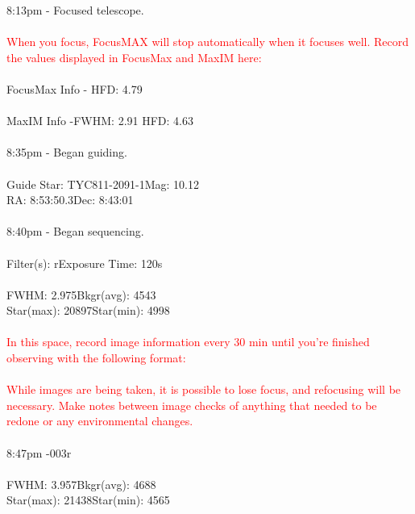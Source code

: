 \documentclass[11pt]{report}
\begin{document}
8:13pm - Focused telescope. \\ \\
\textcolor{red}{When you focus, FocusMAX will stop automatically when it focuses well. Record the values displayed in FocusMax and MaxIM here:} \\  \\
FocusMax Info - \hspace{72pt}HFD: 4.79 \\ \\
MaxIM Info -\hspace{90pt}FWHM: 2.91 \hspace{75pt}HFD: 4.63 \\ \\
8:35pm - Began guiding. \\ \\
Guide Star: TYC811-2091-1\hspace{20pt}Mag: 10.12 \\
RA: 8:53:50.3\hspace{90pt}Dec: 8:43:01\\ \\
8:40pm - Began sequencing. \\ \\
Filter(s): r\hspace{99pt}Exposure Time: 120s\\ \\
FWHM: 2.975\hspace{70pt}Bkgr(avg): 4543 \\
Star(max): 20897\hspace{55pt}Star(min): 4998\\ \\
\textcolor{red}{In this space, record image information every 30 min until you're finished observing with the following format:} \\ \\ 
\textcolor{red}{While images are being taken, it is possible to lose focus, and refocusing will be necessary. Make notes between image checks of anything that needed to be redone or any environmental changes.} \\ \\ 
8:47pm -\hspace{97pt}003r \\ \\
FWHM: 3.957\hspace{70pt}Bkgr(avg): 4688 \\
Star(max): 21438\hspace{55pt}Star(min): 4565\\ \\
\end{document}
